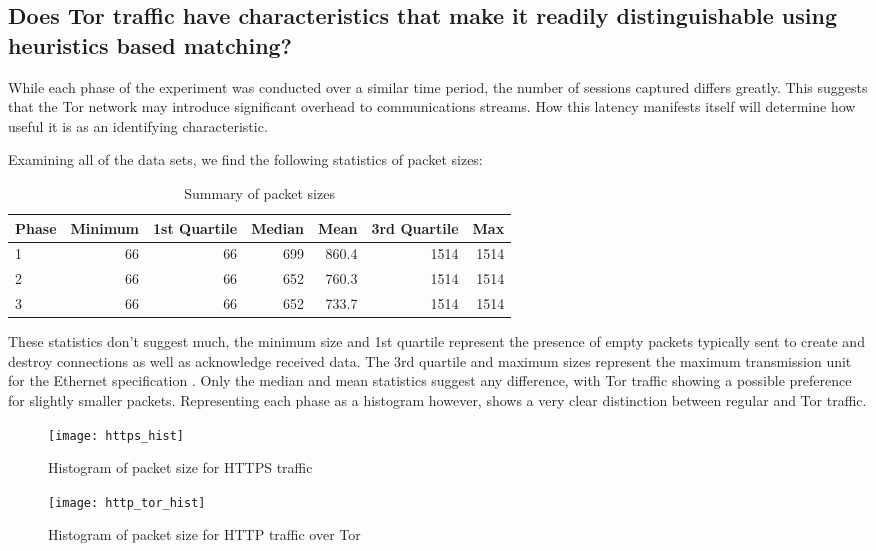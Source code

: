 \subsection{Does Tor traffic have characteristics that make it readily
distinguishable using heuristics based matching?}

While each phase of the experiment was conducted over a similar time
period, the number of sessions captured differs greatly. This suggests that
the Tor network may introduce significant overhead to communications
streams. How this latency manifests itself will determine how useful it is
as an identifying characteristic.

Examining all of the data sets, we find the following statistics of packet
sizes:

\begin{table}[H]
  \begin{tabular}{lrrrrrr}
    \toprule
    Phase & Minimum & 1st Quartile & Median & Mean & 3rd Quartile & Max \\
    \midrule
    1 & 66 & 66 & 699 & 860.4 & 1514 & 1514\\
    2 & 66 & 66 & 652 & 760.3 & 1514 & 1514\\
    3 & 66 & 66 & 652 & 733.7 & 1514 & 1514\\
    \bottomrule
  \end{tabular}
  \caption{Summary of packet sizes}
  \label{table:packet_size_summary}
\end{table}

These statistics don't suggest much, the minimum size and 1st quartile
represent the presence of empty packets typically sent to create and destroy
connections as well as acknowledge received data. The 3rd quartile and maximum
sizes represent the maximum transmission unit for the Ethernet specification
\parencite{Postel:1988fk}. Only the median and mean statistics suggest any
difference, with Tor traffic showing a possible preference for slightly smaller
packets.  Representing each phase as a histogram however, shows a very clear
distinction between regular and Tor traffic.

\begin{figure}[H]
  \centering\texttt{[image: https\_hist]}
  \caption{Histogram of packet size for HTTPS traffic}
  \label{https_hist}
\end{figure}

\begin{figure}[H]
  \centering\texttt{[image: http\_tor\_hist]}
  \caption{Histogram of packet size for HTTP traffic over Tor}
  \label{http_tor_hist}
\end{figure}

